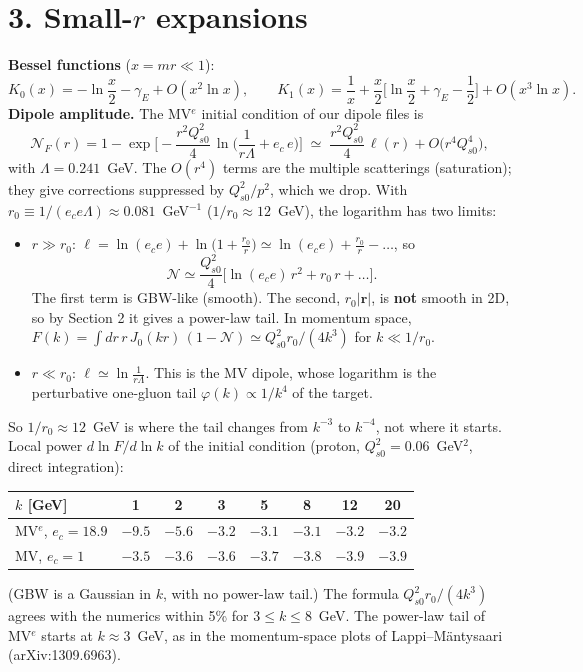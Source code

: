 \documentclass[12pt]{article}
\begin{document}
\section*{3. Small-$r$ expansions}

\textbf{Bessel functions} ($x=mr\ll1$):
\[
  K_0(x)=-\ln\frac{x}{2}-\gamma_E+O(x^2\ln x),\qquad
  K_1(x)=\frac1x+\frac x2\Big[\ln\frac x2+\gamma_E-\frac12\Big]+O(x^3\ln x).
\]
\textbf{Dipole amplitude.} The MV$^e$ initial condition of our dipole files is
\[
  \mathcal{N}_F(r)=1-\exp\Big[-\frac{r^2Q_{s0}^2}{4}\,\ln\Big(\frac{1}{r\Lambda}+e_c\,e\Big)\Big]
  \;\simeq\;\frac{r^2Q_{s0}^2}{4}\,\ell(r)+O\big(r^4Q_{s0}^4\big),
\]
with $\Lambda=0.241$~GeV. The $O(r^4)$ terms are the multiple scatterings (saturation); they give
corrections suppressed by $Q_{s0}^2/p^2$, which we drop. With $r_0\equiv1/(e_ce\Lambda)\approx0.081$~GeV$^{-1}$
($1/r_0\approx12$~GeV), the logarithm has two limits:
\begin{itemize}
\item $r\gg r_0$: $\ell=\ln(e_ce)+\ln\big(1+\frac{r_0}{r}\big)\simeq\ln(e_ce)+\frac{r_0}{r}-\dots$, so
\[
  \mathcal N\simeq\frac{Q_{s0}^2}{4}\Big[\ln(e_ce)\,r^2+r_0\,r+\dots\Big].
\]
The first term is GBW-like (smooth). The second, $r_0|\mathbf r|$, is \textbf{not} smooth in 2D, so by
Section 2 it gives a power-law tail. In momentum space,
$F(k)=\int dr\,r\,J_0(kr)\,(1-\mathcal N)\simeq Q_{s0}^2r_0/(4k^3)$ for $k\ll1/r_0$.
\item $r\ll r_0$: $\ell\simeq\ln\frac{1}{r\Lambda}$. This is the MV dipole, whose logarithm
is the perturbative one-gluon tail $\varphi(k)\propto1/k^4$ of the target.
\end{itemize}
So $1/r_0\approx12$~GeV is where the tail changes from $k^{-3}$ to $k^{-4}$, not where it starts. Local
power $d\ln F/d\ln k$ of the initial condition (proton, $Q_{s0}^2=0.06$~GeV$^2$, direct integration):
\begin{center}
\begin{tabular}{lccccccc}
\toprule
$k$ [GeV] & 1 & 2 & 3 & 5 & 8 & 12 & 20 \\
\midrule
MV$^e$, $e_c=18.9$ & $-9.5$ & $-5.6$ & $-3.2$ & $-3.1$ & $-3.1$ & $-3.2$ & $-3.2$ \\
MV, $e_c=1$        & $-3.5$ & $-3.6$ & $-3.6$ & $-3.7$ & $-3.8$ & $-3.9$ & $-3.9$ \\
\bottomrule
\end{tabular}
\end{center}
(GBW is a Gaussian in $k$, with no power-law tail.) The formula $Q_{s0}^2r_0/(4k^3)$ agrees with the
numerics within 5\% for $3\le k\le8$~GeV. The power-law tail of MV$^e$ starts at $k\approx3$~GeV, as in
the momentum-space plots of Lappi--M\"antysaari (arXiv:1309.6963).
\end{document}
